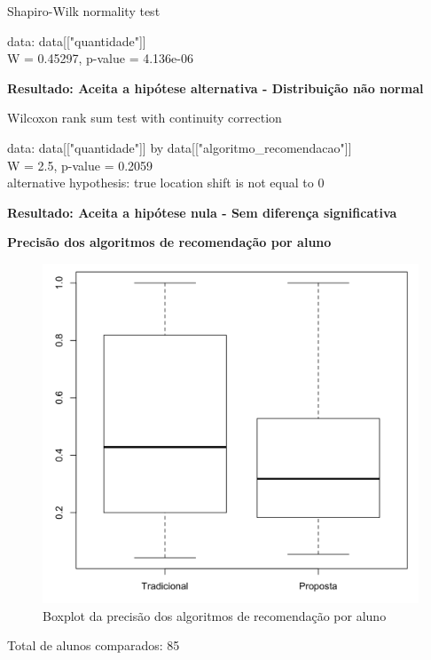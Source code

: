   Shapiro-Wilk normality test

\noindent
data:  data[["quantidade"]]\\
W = 0.45297, p-value = 4.136e-06

\textbf{Resultado: Aceita a hipótese alternativa - Distribuição não normal}

Wilcoxon rank sum test with continuity correction

\noindent
data:  data[["quantidade"]] by data[["algoritmo\_recomendacao"]]\\
W = 2.5, p-value = 0.2059\\
alternative hypothesis: true location shift is not equal to 0

\textbf{Resultado: Aceita a hipótese nula - Sem diferença significativa}

\textbf{Precisão dos algoritmos de recomendação por aluno}

\begin{figure}[htb]
  \caption{\label{fig:precisao-boxplot}Boxplot da precisão dos algoritmos de recomendação por aluno}
  \begin{center}
      \includegraphics[scale=0.4]{./Figuras/precisao-boxplot.png}
  \end{center}
\end{figure}

Total de alunos comparados: 85

